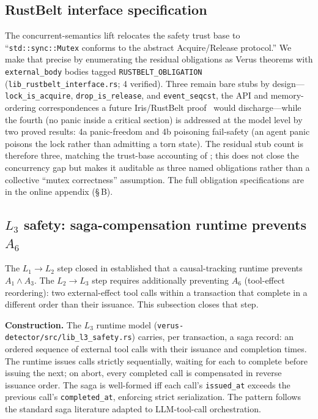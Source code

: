 \documentclass[journal,compsoc,10pt]{IEEEtran}
\providecommand{\citep}{\cite}
\theoremstyle{definition}
\theoremstyle{remark}
\begin{document}
\subsection{RustBelt interface specification}
\label{sec:rustbelt-interface}
The concurrent-semantics lift relocates the safety trust base to
``\texttt{std::sync::Mutex} conforms to the abstract Acquire/Release
protocol.'' We make that precise by enumerating the residual obligations as
Verus theorems with \texttt{external\_body} bodies tagged
\texttt{RUSTBELT\_OBLIGATION} (\texttt{lib\_rustbelt\_interface.rs}; 4
verified). Three remain bare stubs by design---\texttt{lock\_is\_acquire},
\texttt{drop\_is\_release}, and \texttt{event\_seqcst}, the
API and memory-ordering correspondences a future Iris/RustBelt
proof~\citep{Jung2017RustBelt} would discharge---while the fourth
(no panic inside a critical section) is addressed at the model level by two
proved results: 4a panic-freedom and 4b poisoning fail-safety (an agent
panic poisons the lock rather than admitting a torn state). The residual
stub count is therefore three, matching the trust-base accounting of
; this does not close the concurrency gap but
makes it auditable as three named obligations rather than a collective
``mutex correctness'' assumption. The full obligation specifications are in
the online appendix (\S\,B).

\subsection{$L_3$ safety: saga-compensation runtime prevents $A_6$}
\label{sec:l3-safety}

The $L_1 \to L_2$ step closed in 
established that a causal-tracking runtime prevents
$A_1 \wedge A_3$. The $L_2 \to L_3$ step requires additionally
preventing $A_6$ (tool-effect reordering): two
external-effect tool calls within a transaction that complete
in a different order than their issuance. This subsection
closes that step.

\medskip
\noindent\textbf{Construction.}
The $L_3$ runtime model
(\texttt{verus-detector/src/lib\_l3\_safety.rs}) carries, per
transaction, a saga record: an ordered sequence of external
tool calls with their issuance and completion times. The
runtime issues calls strictly sequentially, waiting for each
to complete before issuing the next; on abort, every
completed call is compensated in reverse issuance order. The
saga is well-formed iff each call's \texttt{issued\_at}
exceeds the previous call's \texttt{completed\_at}, enforcing
strict serialization. The pattern follows the standard saga
literature \citep{GarciaMolinaSalem1987Sagas} adapted to
LLM-tool-call orchestration.
\end{document}
